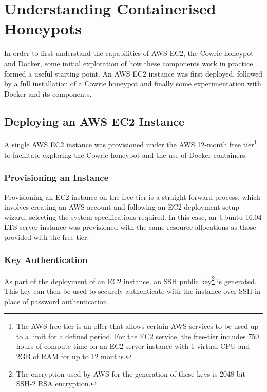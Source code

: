 
\section{Understanding Containerised Honeypots\label{UnderstandingContainerisedHoneypots}}
In order to first understand the capabilities of AWS EC2, the Cowrie honeypot and Docker, some initial exploration of how these components work in practice formed a useful starting point. An AWS EC2 instance was first deployed, followed by a full installation of a Cowrie honeypot and finally some experimentation with Docker and its components.

\subsection{Deploying an AWS EC2 Instance} \label{DeployingAnAWSEC2Instance}
A single AWS EC2 instance was provisioned under the AWS 12-month free tier\footnote{The AWS free tier is an offer that allows certain AWS services to be used up to a limit for a defined period. For the EC2 service, the free-tier includes 750 hours of compute time on an EC2 server instance with 1 virtual CPU and 2GB of RAM for up to 12 months.} to facilitate exploring the Cowrie honeypot and the use of Docker containers.

\subsubsection{Provisioning an Instance}
Provisioning an EC2 instance on the free-tier is a straight-forward process, which involves creating an AWS account and following an EC2 deployment setup wizard, selecting the system specifications required. In this case, an Ubuntu 16.04 LTS server instance was provisioned with the same resource allocations as those provided with the free tier.

\subsubsection{Key Authentication}
As part of the deployment of an EC2 instance, an SSH public key\footnote{The encryption used by AWS for the generation of these keys is 2048-bit SSH-2 RSA encryption.} is generated. This key can then be used to securely authenticate with the instance over SSH  in place of password authentication. 

